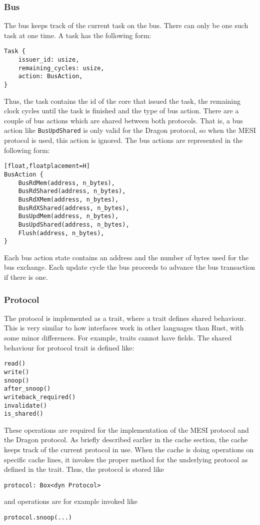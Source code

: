 \subsubsection{Bus}

The bus keeps track of the current task on the bus. There can only be one such task at one time. A
task has the following form:

\begin{lstlisting}[float,floatplacement=H]
Task {
    issuer_id: usize,
    remaining_cycles: usize,
    action: BusAction,
}
\end{lstlisting}

Thus, the task contains the id of the core that issued the task, the remaining clock cycles until
the task is finished and the type of bus action.  There are a couple of bus actions which are shared
between both protocols.  That is, a bus action like \texttt{BusUpdShared} is only valid for the
Dragon protocol, so when the MESI protocol is used, this action is ignored.  The bus actions are
represented in the following form:

\begin{lstlisting}[float,floatplacement=H][float,floatplacement=H]
BusAction {
    BusRdMem(address, n_bytes),
    BusRdShared(address, n_bytes),
    BusRdXMem(address, n_bytes),
    BusRdXShared(address, n_bytes),
    BusUpdMem(address, n_bytes),
    BusUpdShared(address, n_bytes),
    Flush(address, n_bytes),
}
\end{lstlisting}

Each bus action state contains an address and the number of bytes used for the bus exchange.  Each
update cycle the bus proceeds to advance the bus transaction if there is one.

\subsubsection{Protocol}
\label{sec:sub_protocol}
The protocol is implemented as a trait, where a trait defines shared behaviour.  This is very
similar to how interfaces work in other languages than Rust, with some minor differences.  For
example, traits cannot have fields.  The shared behaviour for protocol trait is defined like:

\begin{lstlisting}[float,floatplacement=H]
read()
write()
snoop()
after_snoop()
writeback_required()
invalidate()
is_shared()
\end{lstlisting}
These operations are required for the implementation of the MESI protocol and the Dragon protocol.
As briefly described earlier in the cache section, the cache keeps track of the current protocol in
use.  When the cache is doing operations on specific cache lines, it invokes the proper method for
the underlying protocol as defined in the trait.  Thus, the protocol is stored like
\begin{lstlisting}[float,floatplacement=H]
protocol: Box<dyn Protocol>
\end{lstlisting}
and operations are for example invoked like
\begin{lstlisting}[float,floatplacement=H]
protocol.snoop(...)
\end{lstlisting}

